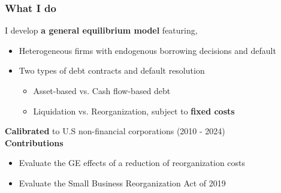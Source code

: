 \documentclass[aspectratio=169,xcolor=table]{beamer}
\begin{document}
\begin{frame}[label=What I do] \frametitle{What I do}

I develop \textbf{a general equilibrium model} featuring,
\begin{itemize} 
    \item Heterogeneous firms with endogenous borrowing decisions and default
    \item Two types of debt contracts and default resolution  \vspace{1mm}
\begin{itemize} \small
    \item Asset-based vs. Cash flow-based debt 
    \item Liquidation vs. Reorganization, subject to \textbf{fixed costs}  
\end{itemize}
\end{itemize} \normalsize  \vspace{3mm}

\textbf {Calibrated} to U.S non-financial corporations (2010 - 2024)  \vspace{3mm} \\
\textbf{Contributions}
\begin{itemize} \small
    \item[1.] Evaluate the GE effects of a reduction of reorganization costs
    \item[2.] Evaluate the Small Business Reorganization Act of 2019 \hfill \hyperlink{SBRA}{}
\end{itemize} \normalsize

\end{frame} 
\end{document}
